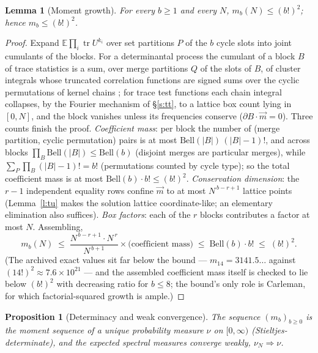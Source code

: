 \documentclass[11pt]{article}
\numberwithin{equation}{section}
\newtheorem{lemma}[theorem]{Lemma}
\newtheorem{proposition}[theorem]{Proposition}
\theoremstyle{definition}
\theoremstyle{remark}
\begin{document}
\begin{lemma}[Moment growth]\label{l:growth}
For every $b\ge1$ and every $N$,
$m_b(N)\le(b!)^2$; hence $m_b\le(b!)^2$.
\end{lemma}

\begin{proof}
Expand $\mathbb E\prod_{i}\operatorname{tr}U^{k_i}$ over set
partitions $P$ of the $b$ cycle slots into joint cumulants of
the blocks. For a determinantal process the cumulant of a
block $B$ of trace statistics is a sum, over merge partitions
$Q$ of the slots of $B$, of cluster integrals whose truncated
correlation functions are signed sums over the cyclic
permutations of kernel chains \cite{Sos00}; for trace test
functions each chain integral collapses, by the Fourier
mechanism of \S\ref{s:tt}, to a lattice box count lying in
$[0,N]$, and the block vanishes unless its frequencies
conserve ($\partial B\cdot\vec m=0$). Three counts finish the
proof. \emph{Coefficient mass}: per block the number of
(merge partition, cyclic permutation) pairs is at most
$\mathrm{Bell}(|B|)\,(|B|-1)!$, and across blocks
$\prod_B\mathrm{Bell}(|B|)\le\mathrm{Bell}(b)$ (disjoint
merges are particular merges), while
$\sum_P\prod_B(|B|-1)!=b!$ (permutations counted by cycle
type); so the total coefficient mass is at most
$\mathrm{Bell}(b)\cdot b!\le(b!)^2$. \emph{Conservation
dimension}: the $r-1$ independent equality rows confine
$\vec m$ to at most $N^{\,b-r+1}$ lattice points
(Lemma~\ref{l:tu} makes the solution lattice coordinate-like;
an elementary elimination also suffices). \emph{Box factors}:
each of the $r$ blocks contributes a factor at most $N$.
Assembling,
\[
m_b(N)\;\le\;\frac{N^{\,b-r+1}\cdot N^{\,r}}{N^{\,b+1}}
\times\bigl(\text{coefficient mass}\bigr)
\;\le\;\mathrm{Bell}(b)\cdot b!\;\le\;(b!)^2 .
\]
(The archived exact values sit far below the bound ---
$m_{14}=3141.5\ldots$ against $(14!)^2\approx7.6\times
10^{21}$ --- and the assembled coefficient mass itself is
checked to lie below $(b!)^2$ with decreasing ratio for
$b\le8$; the bound's only role is Carleman, for which
factorial-squared growth is ample.)
\end{proof}

\begin{proposition}[Determinacy and weak
convergence]\label{p:det}
The sequence $(m_b)_{b\ge0}$ is the moment sequence of a
unique probability measure $\nu$ on $[0,\infty)$
(Stieltjes-determinate), and the expected spectral measures
converge weakly, $\nu_N\Rightarrow\nu$.
\end{proposition}
\end{document}
